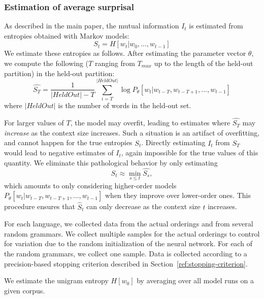 \documentclass[11pt,letterpaper]{article}
\newcommand\mhahn[1]{{\color{red}(#1)}}
\newcounter{theorem}
\begin{document}
\subsubsection{Estimation of average surprisal}

As described in the main paper, the mutual information $I_t$ is estimated from entropies obtained with Markov models:
\begin{equation*}
    S_t = H[w_t | w_0, \dots, w_{t-1}]
\end{equation*}
We estimate these entropies as follows.
After estimating the parameter vector $\theta$, we compute the following ($T$ ranging from $T_{max}$ up to the length of the held-out partition) in the held-out partition:
\begin{equation}
\widehat{S_T} =	\frac{1}{|HeldOut|-T} \sum_{i=T}^{|HeldOut|} \log P_\theta[w_t | w_{t-T}, w_{t-T+1}, ..., w_{t-1}]
\end{equation}
where $|HeldOut|$ is the number of words in the held-out set.

For larger values of $T$, the model may overfit, leading to estimates where $\widehat{S_T}$ may \emph{increase} as the context size increases.
Such a situation is an artifact of overfitting, and cannot happen for the true entropies $S_t$.
Directly estimating $I_t$ from $\widehat{S_T}$ would lead to negative estimates of $I_t$, again impossible for the true values of this quantity.
We eliminate this pathological behavior by only estimating
\begin{equation}
S_t \approx \min_{s \leq t} \widehat{S_s},
\end{equation}
which amounts to only considering higher-order models $P_\theta[w_t | w_{t-T}, w_{t-T+1}, ..., w_{t-1}]$ when they improve over lower-order ones.
This procedure ensures that $\hat{S}_t$ can only decrease as the context size $t$ increases.


For each language, we collected data from the actual orderings and from several random grammars.
We collect multiple samples for the actual orderings to control for variation due to the random initialization of the neural network.
For each of the random grammars, we collect one sample.
Data is collected according to a precision-based stopping criterion described in Section~\ref{ref:stopping-criterion}.


We estimate the unigram entropy $H[w_0]$ by averaging over all model runs on a given corpus.



\end{document}
